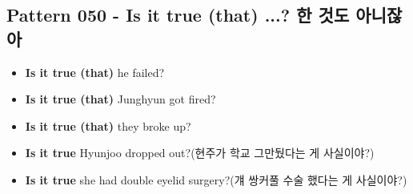 \documentclass[11pt]{oblivoir}
\begin{document}
\subsection{Pattern 050 - Is it true (that) ...? \texttildelow 한 것도 아니잖아}
\begin{itemize}
  \item \textbf{Is it true (that)} he failed?
  \item \textbf{Is it true (that)} Junghyun got fired?
  \item \textbf{Is it true (that)} they broke up?
  \item \textbf{Is it true} Hyunjoo dropped out?(현주가 학교 그만뒀다는 게 사실이야?)
  \item \textbf{Is it true} she had double eyelid surgery?(걔 쌍커풀 수술 했다는 게 사실이야?)
\end{itemize}
\end{document}
